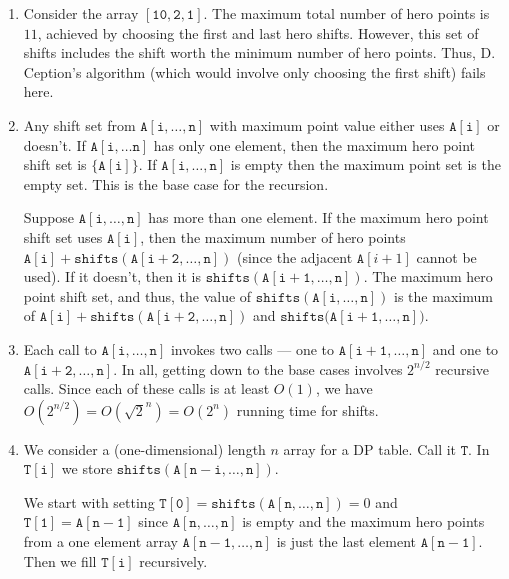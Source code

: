 \documentclass[12 pt, letterpaper]{hmcpset}
\begin{document}
\begin{solution}
	\begin{enumerate}
		\item Consider the array $\mathtt{[10, 2, 1]}$. The maximum total number of hero points is $11$, achieved by choosing the first and last hero shifts. However, this set of shifts includes the shift worth the minimum number of hero points. Thus, D. Ception's algorithm (which would involve only choosing the first shift) fails here.

		\item Any shift set from $\mathtt{A[i, \dots, n]}$ with maximum point value either uses $\mathtt{A[i]}$ or doesn't. If $\mathtt{A[i, \dots n]}$ has only one element, then the maximum hero point shift set is $\{ \mathtt{A[i]} \}$. If $\mathtt{A[i, \dots, n]}$ is empty then the maximum point set is the empty set. This is the base case for the recursion.

		Suppose $\mathtt{A[i, \dots, n]}$ has more than one element. If the maximum hero point shift set uses $\mathtt{A[i]}$, then the maximum number of hero points $\mathtt{A[i]} + \mathtt{shifts}(\mathtt{A[i + 2, \dots, n]})$ (since the adjacent $\mathtt{A}[i + 1]$ cannot be used). If it doesn't, then it is $\mathtt{shifts}(\mathtt{A[i + 1, \dots, n]})$. The maximum hero point shift set, and thus, the value of $\mathtt{shifts}(\mathtt{A[i, \dots, n]})$ is the maximum of $\mathtt{A[i]} + \mathtt{shifts}(\mathtt{A[i + 2, \dots, n]})$ and $\mathtt{shifts}(\mathtt{A[i + 1, \dots, n])}$.

		\item Each call to $\mathtt{A[i, \dots, n]}$ invokes two calls --- one to $\mathtt{A[i + 1, \dots, n]}$ and one to $\mathtt{A[i + 2, \dots, n]}$. In all, getting down to the base cases involves $2^{n / 2}$ recursive calls. Since each of these calls is at least $O(1)$, we have $O(2^{n / 2}) = O(\sqrt{2}^{n}) = O(2^{n})$ running time for shifts.

		\item We consider a (one-dimensional) length $n$ array for a DP table. Call it $\mathtt{T}$. In $\mathtt{T[i]}$ we store $\mathtt{shifts(A[n - i, \dots, n])}$.

			We start with setting $\mathtt{T[0]} = \mathtt{shifts(A[n, \dots, n])} = 0$ and $\mathtt{T[1]} = \mathtt{A[n - 1]}$ since $\mathtt{A[n, \dots, n]}$ is empty and the maximum hero points from a one element array $\mathtt{A[n - 1, \dots, n]}$ is just the last element $\mathtt{A[n - 1]}$. Then we fill $\mathtt{T[i]}$ recursively.


\end{enumerate}
\end{solution}
\end{document}
